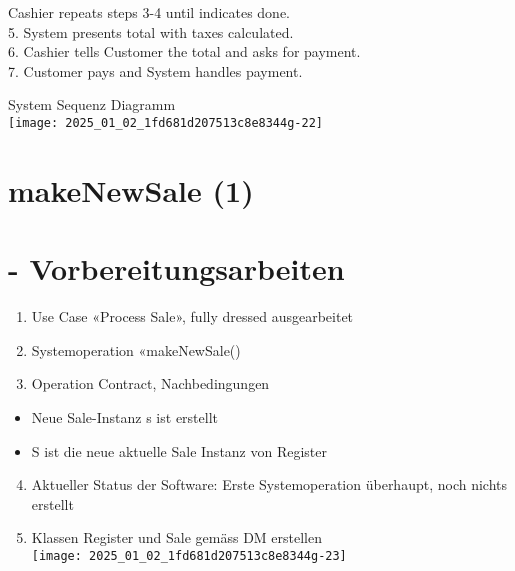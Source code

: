 \documentclass[10pt]{article}
\begin{document}
Cashier repeats steps 3-4 until indicates done.\\
5. System presents total with taxes calculated.\\
6. Cashier tells Customer the total and asks for payment.\\
7. Customer pays and System handles payment.

System Sequenz Diagramm\\
\texttt{[image: 2025\_01\_02\_1fd681d207513c8e8344g-22]}

\section*{makeNewSale (1)}
\section*{- Vorbereitungsarbeiten}
\begin{enumerate}
  \item Use Case «Process Sale», fully dressed ausgearbeitet
  \item Systemoperation «makeNewSale()
  \item Operation Contract, Nachbedingungen
\end{enumerate}

\begin{itemize}
  \item Neue Sale-Instanz s ist erstellt
  \item S ist die neue aktuelle Sale Instanz von Register
\end{itemize}

\begin{enumerate}
  \setcounter{enumi}{3}
  \item Aktueller Status der Software: Erste Systemoperation überhaupt, noch nichts erstellt
  \item Klassen Register und Sale gemäss DM erstellen\\
\texttt{[image: 2025\_01\_02\_1fd681d207513c8e8344g-23]}
\end{enumerate}
\end{document}
